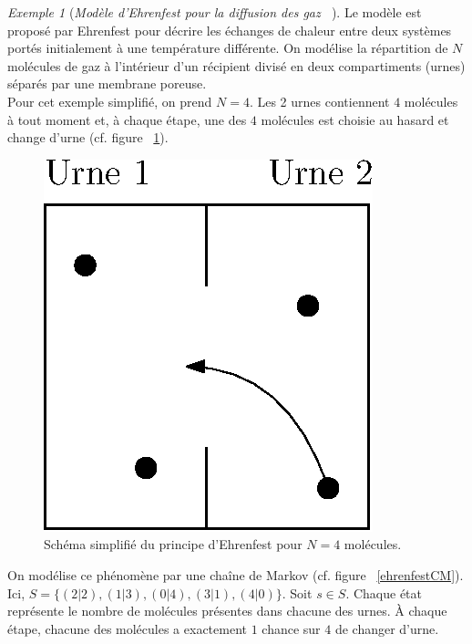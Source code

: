 \documentclass[12pt,a4paper]{report}
\theoremstyle{definition}%
\theoremstyle{remark}
\newtheorem{example}{Exemple}[chapter]
\newcommand{\cf}{cf. }
\begin{document}
\begin{example}[\textit{Modèle d'Ehrenfest pour la diffusion des gaz ~\cite{Course3}}]
	Le modèle est proposé par Ehrenfest pour décrire les échanges de chaleur entre deux systèmes portés initialement à une température différente. On modélise la répartition de $N$ molécules de gaz à l'intérieur d'un récipient divisé en deux compartiments (urnes) séparés par une membrane poreuse.\\
	Pour cet exemple simplifié, on prend $N = 4$. Les 2 urnes contiennent $4$ molécules à tout moment et, à chaque étape, une des $4$ molécules est choisie au hasard et change d'urne (\cf figure ~\ref{ehrenfestscheme}).
	\begin{figure}[H]
		\centering
		\includegraphics[scale=0.5]{figures/EhrenfestUrne.eps}
		\caption{Schéma simplifié du principe d'Ehrenfest pour $N=4$ molécules.}
		\label{ehrenfestscheme}
	\end{figure}
	
	On modélise ce phénomène par une chaîne de Markov (\cf figure ~\ref{ehrenfestCM}). Ici, $S=\{(2|2), (1|3), (0|4), (3|1), (4|0) \}$. Soit $s \in S$. Chaque état représente le nombre de molécules présentes dans chacune des urnes. \`A chaque étape, chacune des molécules a exactement $1$ chance sur $4$ de changer d'urne.


\end{example}
\end{document}
